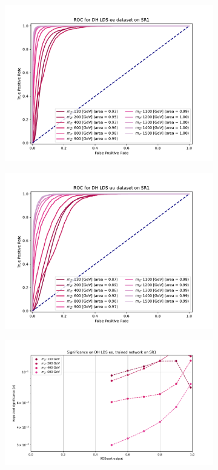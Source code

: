 \documentclass[12pt, a4paper]{book}
\begin{document}
\begin{figure}[!ht]
\begin{subfigure}[b]{0.49\textwidth}
      \centering
      \includegraphics[width=1\textwidth]{XGBoost/Model_independent/50-100/DH_LDS/ROC_ee.pdf}
   \end{subfigure}
   \hfill
   \begin{subfigure}[b]{0.49\textwidth}
      \centering
      \includegraphics[width=1\textwidth]{XGBoost/Model_independent/50-100/DH_LDS/ROC_uu.pdf}
   \end{subfigure}
   \hfill
	\begin{subfigure}[b]{0.49\textwidth}
      \centering
      \includegraphics[width=1\textwidth]{XGBoost/Model_independent/50-100/DH_LDS/EXP_SIG_ee.pdf}

\end{subfigure}
\end{figure}
\end{document}
